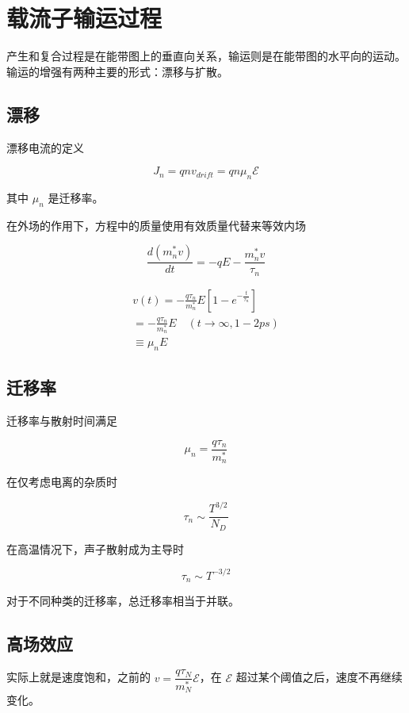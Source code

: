 \documentclass[cn,11pt,chinese,black,simple]{../elegantbook}
\begin{document}
\fi 

\chapter{载流子输运过程}


产生和复合过程是在能带图上的垂直向关系，输运则是在能带图的水平向的运动。输运的增强有两种主要的形式：漂移与扩散。

\section{漂移}

漂移电流的定义 

\[J_n = q n v_{drift} = q n \mu_n \mathscr{E}\]

其中 \(\mu_n\) 是迁移率。

在外场的作用下，方程中的质量使用有效质量代替来等效内场

\[\frac{d\left(m_{n}^{*} v\right)}{d t}=-q E -\frac{m_{n}^{*} v}{\tau_{n}}\]

\[\begin{array}{l}
    v(t)=-\frac{q \tau_{n}}{m_{n}^{*}} E \left[1-e^{-\frac{t}{\tau_{n}}}\right] \\
    =-\frac{q \tau_{n}}{m_{n}^{*}} E \quad(t \rightarrow \infty, 1-2 ps ) \\
    \equiv \mu_{n} E
\end{array}\]

\section{迁移率}

迁移率与散射时间满足 

\[\mu_n = \dfrac{q \tau_n}{m_n^*}\]

在仅考虑电离的杂质时

\[\tau_n \sim \dfrac{T^{3/2}}{N_D}\]

在高温情况下，声子散射成为主导时

\[\tau_n \sim T^{-3/2}\]

对于不同种类的迁移率，总迁移率相当于并联。

\section{高场效应}

实际上就是速度饱和，之前的 \(v = \dfrac{q \tau_N}{m_N^*} \mathscr{E}\)，在 \(\mathscr{E}\) 超过某个阈值之后，速度不再继续变化。
\end{document}
